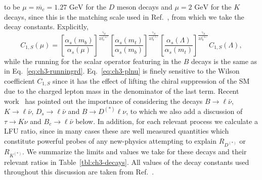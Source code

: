 to be $\mu = \overline{m_c} = 1.27 \text{ GeV}$ for the $D$ meson decays and $\mu = 2
\text{ GeV}$ for the $K$ decays, since this is the matching scale used in
Ref.~\cite{Aoki:2016frl}, from which we take the decay constants. Explicitly,
\begin{equation}
  C_{1,S} (\mu) = \left[\frac{\alpha_s(m_b)}{\alpha_s(\mu)} \right]^{\frac{\gamma_S}{2\beta_0^{(4)}}} \left[\frac{\alpha_s(m_t)}{\alpha_s(m_b)} \right]^{\frac{\gamma_S}{2\beta_0^{(5)}}} \left[\frac{\alpha_s(\Lambda)}{\alpha_s(m_t)} \right]^{\frac{\gamma_S}{2\beta_0^{(6)}}} C_{1,S}(\Lambda),
\end{equation}
while the running for the scalar operator featuring in the $B$ decays is the
same as in Eq.~\eqref{eq:ch3-runningrd}. Eq.~\eqref{eq:ch3-plnu} is finely sensitive to
the Wilson coefficient $C_{1,S}$ since it has the effect of lifting the chiral
suppression of the SM due to the charged lepton mass in the denominator of the
last term. Recent work~\cite{Becirevic:2016oho} has pointed out the importance
of considering the decays $B \to \ell \bar{\nu}$, $K \to \ell \bar{\nu}$, $D_s
\to \ell \bar{\nu}$ and $B \to D^{(*)} \ell \nu$, to which we also add a
discussion of $\tau \to K \nu$ and $B_c \to \ell \bar{\nu}$ below. In addition,
for each relevant process we calculate a LFU ratio, since in many cases these
are well measured quantities which constitute powerful probes of any new-physics
attempting to explain $R_{D^{(*)}}$ or $R_{K^{(*)}}$. We summarize the limits
and values we take for these decays and their relevant ratios in
Table~\ref{tbl:ch3-decays}. All values of the decay constants used throughout this
discussion are taken from Ref.~\cite{Aoki:2016frl}.

